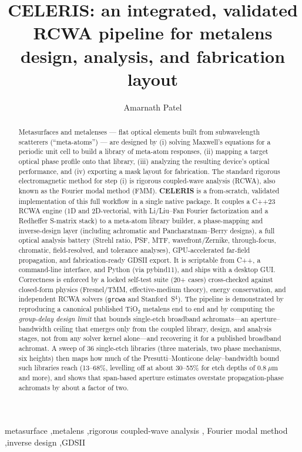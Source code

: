 \documentclass[preprint,12pt]{elsarticle}
\begin{document}
\begin{frontmatter}

\title{CELERIS: an integrated, validated RCWA pipeline for metalens
design, analysis, and fabrication layout}

\author[ucf]{Amarnath Patel}

\begin{abstract}
Metasurfaces and metalenses --- flat optical elements built from subwavelength
scatterers (``meta-atoms'') --- are designed by (i) solving Maxwell's equations
for a periodic unit cell to build a library of meta-atom responses, (ii) mapping
a target optical phase profile onto that library, (iii) analyzing the resulting
device's optical performance, and (iv) exporting a mask layout for fabrication.
The standard rigorous electromagnetic method for step (i) is rigorous coupled-wave
analysis (RCWA), also known as the Fourier modal method (FMM). \textbf{CELERIS} is
a from-scratch, validated implementation of this full workflow in a single
native package. It couples a C++23 RCWA engine (1D and 2D-vectorial, with Li/Liu--Fan
Fourier factorization and a Redheffer S-matrix stack) to a meta-atom library builder,
a phase-mapping and inverse-design layer (including achromatic and Pancharatnam--Berry
designs), a full optical analysis battery (Strehl ratio, PSF, MTF, wavefront/Zernike,
through-focus, chromatic, field-resolved, and tolerance analyses), GPU-accelerated
far-field propagation, and fabrication-ready GDSII export. It is scriptable from C++,
a command-line interface, and Python (via pybind11), and ships with a desktop GUI.
Correctness is enforced by a locked self-test suite (20+ cases) cross-checked against
closed-form physics (Fresnel/TMM, effective-medium theory), energy conservation, and
independent RCWA solvers (\texttt{grcwa} and Stanford~S$^4$). The pipeline is
demonstrated by reproducing a canonical published TiO$_2$ metalens end to end and by
computing the \emph{group-delay design limit} that bounds single-etch broadband
achromats---an aperture--bandwidth ceiling that emerges only from the coupled library,
design, and analysis stages, not from any solver kernel alone---and recovering it for a
published broadband achromat. A sweep of 36 single-etch libraries (three materials, two
phase mechanisms, six heights) then maps how much of the Presutti--Monticone
delay--bandwidth bound such libraries reach (13--68\%, levelling off at about 30--55\%
for etch depths of $0.8~\mu$m and more), and shows that span-based
aperture estimates overstate propagation-phase achromats by about a factor of two.
\end{abstract}

\begin{keyword}
metasurface \sep metalens \sep rigorous coupled-wave analysis \sep
Fourier modal method \sep inverse design \sep GDSII
\end{keyword}

\end{frontmatter}
\end{document}
